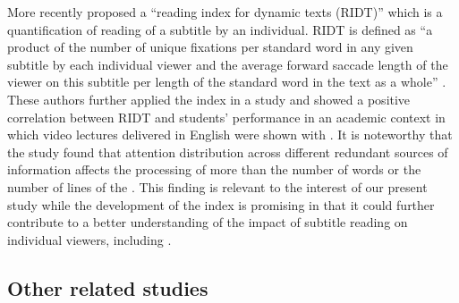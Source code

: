 \documentclass[output=paper]{langsci/langscibook}
\begin{document}
More recently \citet{Kruger2014} proposed a ``reading index for dynamic texts (RIDT)'' which is a quantification of reading of a subtitle by an individual. RIDT is defined as ``a product of the number of unique fixations per standard word in any given subtitle by each individual viewer and the average forward saccade length of the viewer on this subtitle per length of the standard word in the text as a whole'' \citep[110]{Kruger2014}.  These authors further applied the index in a study and showed a positive correlation between RIDT and students' performance in an academic context in which video lectures delivered in English were shown with . It is noteworthy that the study found that attention distribution across different redundant sources of information affects the processing of  more than the number of words or the number of lines of the . This finding is relevant to the interest of our present study while the development of the index is promising in that it could further contribute to a better understanding of the impact of subtitle reading on individual viewers, including .


\subsection{Other related  studies}
\end{document}
